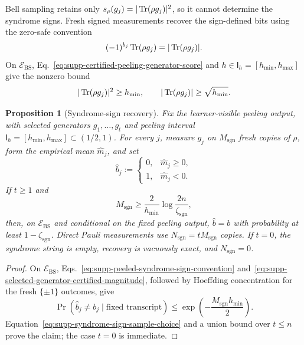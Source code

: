 \documentclass[
  aps,
  prx,
  reprint,
  superscriptaddress,
  amsmath,
  amssymb,
  nofootinbib,
  longbibliography
]{revtex4-2}
\newtheorem{proposition}[theorem]{Proposition}
\begin{document}
Bell sampling retains only
$s_\rho(g_j)=|\Tr(\rho g_j)|^2$, so it cannot determine the syndrome signs.
Fresh signed measurements recover the sign-defined bits using the zero-safe
convention
\begin{equation}
(-1)^{b_j}\Tr(\rho g_j)=|\Tr(\rho g_j)|.
\label{eq:supp-peeled-syndrome-sign-convention}
\end{equation}
On $\mathcal E_{\mathrm{BS}}$,
Eq.~\eqref{eq:supp-certified-peeling-generator-score} and
$h\in\mathsf I_h=[h_{\min},h_{\max}]$ give the nonzero bound
\begin{equation}
|\Tr(\rho g_j)|^2\ge h_{\min},
\qquad
|\Tr(\rho g_j)|
\ge
\sqrt{h_{\min}}.
\label{eq:supp-selected-generator-certified-magnitude}
\end{equation}

\begin{proposition}[Syndrome-sign recovery]
\label{prop:supp-peeled-syndrome-sign-recovery}
Fix the learner-visible peeling output, with selected generators
$g_1,\dots,g_t$ and peeling interval
$\mathsf I_h=[h_{\min},h_{\max}]\subset(1/2,1)$.  For every $j$, measure
$g_j$ on $M_{\mathrm{sgn}}$ fresh copies of $\rho$, form the empirical
mean $\widehat m_j$, and set
\begin{equation}
\widehat b_j
:=
\begin{cases}
0,&\widehat m_j\ge0,\\
1,&\widehat m_j<0.
\end{cases}
\end{equation}
If $t\ge1$ and
\begin{equation}
M_{\mathrm{sgn}}
\ge
\frac{2}{h_{\min}}
\log\frac{2n}{\zeta_{\mathrm{sgn}}},
\label{eq:supp-syndrome-sign-sample-choice}
\end{equation}
then, on $\mathcal E_{\mathrm{BS}}$ and conditional on the fixed peeling
output, $\widehat b=b$ with probability at least
$1-\zeta_{\mathrm{sgn}}$.  Direct Pauli measurements use $N_{\mathrm{sgn}}=tM_{\mathrm{sgn}}$ copies. 
If $t=0$, the syndrome string is empty, recovery is vacuously exact, and
$N_{\mathrm{sgn}}=0$.
\end{proposition}

\begin{proof}
On $\mathcal E_{\mathrm{BS}}$,
Eqs.~\eqref{eq:supp-peeled-syndrome-sign-convention}
and~\eqref{eq:supp-selected-generator-certified-magnitude}, followed by
Hoeffding concentration for the fresh $\{\pm1\}$ outcomes, give
\begin{equation}
\Pr(\widehat b_j\ne b_j\mid\text{fixed transcript})
\le
\exp\!\left(-\frac{M_{\mathrm{sgn}}h_{\min}}{2}\right).
\end{equation}
Equation~\eqref{eq:supp-syndrome-sign-sample-choice} and a union bound over
$t\le n$ prove the claim; the case $t=0$ is immediate.
\end{proof}
\end{document}
